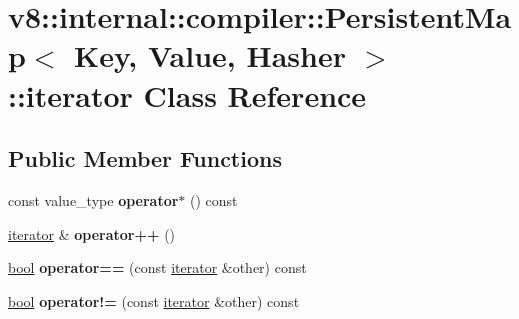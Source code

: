 \hypertarget{classv8_1_1internal_1_1compiler_1_1PersistentMap_1_1iterator}{}\section{v8\+:\+:internal\+:\+:compiler\+:\+:Persistent\+Map$<$ Key, Value, Hasher $>$\+:\+:iterator Class Reference}
\label{classv8_1_1internal_1_1compiler_1_1PersistentMap_1_1iterator}
\subsection*{Public Member Functions}
\begin{DoxyCompactItemize}
\item 
\mbox{\label{classv8_1_1internal_1_1compiler_1_1PersistentMap_1_1iterator_afeaf53570ee2e6dcbead98190cf34086}} 
const value\+\_\+type {\bfseries operator$\ast$} () const
\item 
\mbox{\label{classv8_1_1internal_1_1compiler_1_1PersistentMap_1_1iterator_a64270045baf16370bb87c57f07e59568}} 
\mbox{\hyperlink{classv8_1_1internal_1_1compiler_1_1PersistentMap_1_1iterator}{iterator}} \& {\bfseries operator++} ()
\item 
\mbox{\label{classv8_1_1internal_1_1compiler_1_1PersistentMap_1_1iterator_ac5a3392a7245a4e40b8303d826877d7c}} 
\mbox{\hyperlink{classbool}{bool}} {\bfseries operator==} (const \mbox{\hyperlink{classv8_1_1internal_1_1compiler_1_1PersistentMap_1_1iterator}{iterator}} \&other) const
\item 
\mbox{\label{classv8_1_1internal_1_1compiler_1_1PersistentMap_1_1iterator_a6dd7e503d3c6ec700fc66e42e8524c8a}} 
\mbox{\hyperlink{classbool}{bool}} {\bfseries operator!=} (const \mbox{\hyperlink{classv8_1_1internal_1_1compiler_1_1PersistentMap_1_1iterator}{iterator}} \&other) const
\item 
\mbox{\label{classv8_1_1internal_1_1compiler_1_1PersistentMap_1_1iterator_a2e4ebcafb01d21de00b9e1a75ace5642}} 

\end{DoxyCompactItemize}
